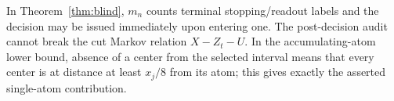 In Theorem~\ref{thm:blind}, $m_n$ counts terminal stopping/readout labels and the decision may be issued immediately upon entering one. The post-decision audit cannot break the cut Markov relation $X-Z_t-U$. In the accumulating-atom lower bound, absence of a center from the selected interval means that every center is at distance at least $x_j/8$ from its atom; this gives exactly the asserted single-atom contribution.
